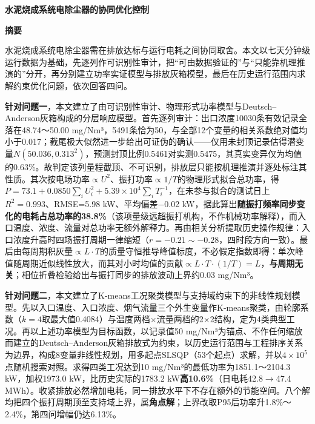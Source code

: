 \documentclass[UTF8,zihao=5,a4paper]{ctexart}
\begin{document}
\begin{center}
{\bfseries 水泥烧成系统电除尘器的协同优化控制}
\end{center}
\vspace{6pt}
\begin{center}{\bfseries 摘\quad 要}\end{center}
\vspace{2pt}
水泥烧成系统电除尘器需在排放达标与运行电耗之间协同取舍。本文以七天分钟级运行数据为基础，先逐列作可识别性审计，把“可由数据验证的”与“只能靠机理推演的”分开，再分别建立功率实证模型与排放灰箱模型，最后在历史运行范围内求解约束优化问题，依次回答四问。

\textbf{针对问题一}，本文建立了由可识别性审计、物理形式功率模型与Deutsch–Anderson灰箱构成的分层响应模型。首先逐列审计：出口浓度10030条有效记录全落在48.74～50.00 mg/Nm³，5491条恰为50，与全部12个变量的相关系数绝对值均小于0.017；截尾极大似然进一步给出可证伪的确认——仅用未封顶记录估得潜变量$N(50.036,0.313^2)$，预测封顶比例0.5461对实测0.5475，其真实变异仅为均值的0.63\%。故判定该列量程截顶、不可识别，排放层只能按机理推演并逐处标注其性质。其次按电场功率$\propto$$U^2$、振打功率$\propto$$1/T$的物理形式拟合总功率，得$P=73.1+0.0850\sum_i U_i^{2}+5.39\times10^{4}\sum_i T_i^{-1}$，在未参与拟合的测试日上$R^2=0.993$、RMSE=5.98 kW、平均偏差−0.02 kW，据此算出\textbf{随振打频率同步变化的电耗占总功率的38.8\%}（该项量级远超振打机构，不作机械功率解释），而入口温度、浓度、流量对总功率无额外解释力。再由相关分析提取历史操作规律：入口浓度升高时四场振打周期一律缩短（$r=-0.21\sim-0.28$，四时段方向一致）。最后由每周期积灰量$\propto L\cdot T$的质量守恒推导峰值标度，不必假定指数即得：单次峰值随周期近似线性放大，而其对小时均值的贡献$\propto L\cdot T\cdot(1/T)=L$，\textbf{与周期无关}；相位折叠检验给出与振打同步的排放波动上界约0.03 mg/Nm³。

\textbf{针对问题二}，本文建立了K-means工况聚类模型与支持域约束下的非线性规划模型。先以入口温度、入口浓度、烟气流量三个外生变量作K-means聚类，由轮廓系数（$k=4$取最大值0.4084）与温度两档×流量两档的2×2结构，定为4类典型工况。再以上述功率模型为目标函数，以记录值50 mg/Nm³为锚点、不作任何缩放而建立的Deutsch–Anderson灰箱排放式为约束，以历史运行范围与工程排序关系为边界，构成8变量非线性规划，用多起点SLSQP（53个起点）求解，并以$4\times10^{5}$点随机搜索对照。求得四类工况达到10 mg/Nm³的最低功率为1851.1～2104.3 kW，加权1973.0 kW，比历史实际的1783.2 kW\textbf{高10.6\%}（日电耗42.8$\rightarrow$47.4 MWh）。收紧排放必然增加电耗，同一排放水平下不存在额外的节能空间。八个解均把四个振打周期顶至支持域上界，属\textbf{角点解}；上界改取P95后功率升1.8\%～2.4\%，第四问增幅仍达6.13\%。
\end{document}
